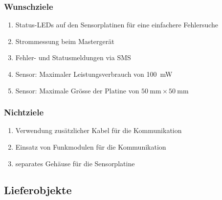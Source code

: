 

\subsubsection{Wunschziele}

\begin{enumerate}
    \item
        Status-LEDs auf den Sensorplatinen f\"ur eine einfachere Fehlersuche
    \item
        Strommessung beim Masterger\"at
    \item
        Fehler- und Statusmeldungen via SMS
    \item
        Sensor: Maximaler Leistungsverbrauch von \SI{100}{\milli\watt}
	\item
		Sensor: Maximale Gr\"osse der Platine von $\SI{50}{\milli\meter} \times \SI{50}{\milli\meter}$
\end{enumerate}


\subsubsection{Nichtziele}

\begin{enumerate}
    \item
        Verwendung zus\"atzlicher Kabel f\"ur die Kommunikation
    \item
        Einsatz von Funkmodulen f\"ur die Kommunikation
    \item
        separates Geh\"ause f\"ur die Sensorplatine
\end{enumerate}

\subsection{Lieferobjekte}

